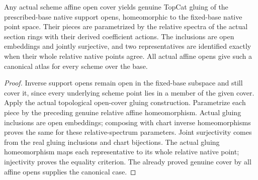 \begin{theorem}
\label{scheme:relative-native-affine-atlas}
\leanok
{}
Any actual scheme affine open cover yields genuine TopCat gluing of the
prescribed-base native support opens, homeomorphic to the fixed-base native
point space. Their pieces are parametrized by the relative spectra of the
actual section rings with their derived coefficient actions. The inclusions
are open embeddings and jointly surjective, and two representatives are
identified exactly when their whole relative native points agree. All actual
affine opens give such a canonical atlas for every scheme over the base.
\end{theorem}
\begin{proof}
Inverse support opens remain open in the fixed-base subspace and still cover
it, since every underlying scheme point lies in a member of the given cover.
Apply the actual topological open-cover gluing construction. Parametrize each
piece by the preceding genuine relative affine homeomorphism. Actual gluing
inclusions are open embeddings; composing with chart inverse homeomorphisms
proves the same for these relative-spectrum parameters. Joint surjectivity
comes from the real gluing inclusions and chart bijections. The actual gluing
homeomorphism maps each representative to its whole relative native point;
injectivity proves the equality criterion. The already proved genuine cover
by all affine opens supplies the canonical case.
\end{proof}
